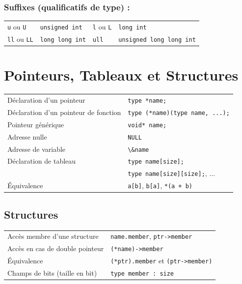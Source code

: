 \documentclass{article}
\newcommand{\cd}{\lstinline}
\begin{document}
\begin{multicols*}{3}
\begin{tabularx}{\linewidth}{
  >{\hsize=0.4\hsize}X%
  >{\hsize=1.5\hsize}X%
  >{\hsize=0.6\hsize}X%
  >{\hsize=1.5\hsize}X%
  }
\end{tabularx}
\subsubsection*{Suffixes (qualificatifs de type) :}
\begin{tabularx}{\linewidth}{
  >{\hsize=0.5\hsize}X%
  >{\hsize=1.1\hsize}X%
  >{\hsize=0.9\hsize}X%
  >{\hsize=1.5\hsize}X%
  }
  \cd{u} ou \cd{U}  & \cd{unsigned int} & \cd{l} ou \cd{L} & \cd{long int} \\
  \cd{ll} ou \cd{LL}  & \cd{long long int} & \cd{ull} & \cd{unsigned long long int} \\
\end{tabularx}

\section*{Pointeurs, Tableaux et Structures}
\begin{tabularx}{\linewidth}{Xl}
  Déclaration d'un pointeur & \cd{type *name;} \\
  Déclaration d'un pointeur de fonction & \cd{type (*name)(type name, ...);} \\
  Pointeur générique & \cd{void* name;} \\
  Adresse nulle & \cd{NULL} \\
  Adresse de variable & \cd{\&name} \\
  Déclaration de tableau & \cd{type name[size];} \\
                         & \cd{type name[size][size];}, ... \\
  Équivalence & \cd{a[b]}, \cd{b[a]}, \cd{*(a + b)}
\end{tabularx}

\subsection*{Structures}
\begin{tabularx}{\linewidth}{Xl}
  Accès membre d'une structure & \cd{name.member}, \cd{ptr->member} \\
  Accès en cas de double pointeur & \cd{(*name)->member} \\
  Équivalence & \cd{(*ptr).member} et \cd{(ptr->member)}  \\
  Champs de bits (taille en bit) & \cd{type member : size} \\
\end{tabularx}


\end{multicols*}
\end{document}
